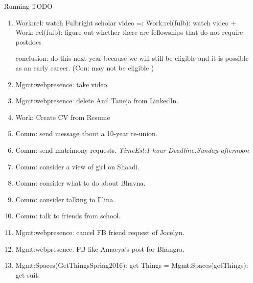 \documentclass[serif, mathserif, final]{beamer}
\newcommand{\te}[1]{\textit{TimeEst:}\textit{#1}}
\newcommand{\dl}[1]{\textit{Deadline:}\textit{#1}}
\begin{document}
\begin{frame}
\begin{columns}
\begin{column}{0.5\linewidth}
\begin{block}{Running TODO}
\begin{enumerate}
        \item \tiny Work:rel: watch Fulbright scholar video
          =: Work:rel(fulb): watch video + Work: rel(fulb): figure out whether there are fellowships
          that do not require postdocs 

          conclusion: do this next year because we will still be
          eligible and it is possible as an early career. (Con: may
          not be eligible ) 

        \item \tiny Mgmt:webpresence: take video. 

        \item \tiny Mgmt:webpresence: delete Anil Taneja from
          LinkedIn.

        \item \tiny Work: Create CV from Resume 


        \item \tiny Comm: send message about a 10-year re-union. 
        \item \tiny Comm: send matrimony requests. \te{1 hour}
          \dl{Sunday afternoon}

        \item \tiny Comm: consider a view of girl on Shaadi. 
        \item \tiny Comm: consider what to do about Bhavna. 

        \item \tiny Comm: consider talking to Illina. 
        \item \tiny Comm: talk to friends from school. 


        \item \tiny Mgmt:webpresence: cancel FB friend request of
          Jocelyn.  
        \item \tiny Mgmt:webpresence: FB like Amaeya's post for
          Bhangra. 
        \item \tiny Mgmt:Spaces(GetThingsSpring2016): get Things =
          Mgmt:Spaces(getThings): get suit. 
        \end{enumerate}
      \end{block}


\end{column}
\end{columns}
\end{frame}
\end{document}
